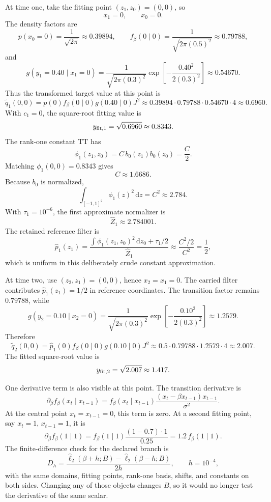 \documentclass[11pt]{article}
\newcommand{\dd}{\,\mathrm d}
\begin{document}
At time one, take the fitting point \((z_1,z_0)=(0,0)\), so
\[
    x_1=0,\qquad x_0=0.
    \label{eq:p24-trace-point1}
\]
The density factors are
\[
    p(x_0=0)=\frac{1}{\sqrt{2\pi}}\approx0.39894,
    \qquad
    f_\beta(0\mid0)=\frac{1}{\sqrt{2\pi(0.5)^2}}\approx0.79788,
    \label{eq:p24-trace-density1}
\]
and
\[
    g(y_1=0.40\mid x_1=0)
    =
    \frac{1}{\sqrt{2\pi(0.3)^2}}
    \exp\!\left[-\frac{0.40^2}{2(0.3)^2}\right]
    \approx0.54670.
    \label{eq:p24-trace-density2}
\]
Thus the transformed target value at this point is
\[
    \widetilde q_1(0,0)
    =
    p(0)f_\beta(0\mid0)g(0.40\mid0)J^2
    \approx
    0.39894\cdot0.79788\cdot0.54670\cdot4
    \approx0.6960.
    \label{eq:p24-trace-q1}
\]
With \(c_1=0\), the square-root fitting value is
\[
    y_{\rm fit,1}=\sqrt{0.6960}\approx0.8343.
    \label{eq:p24-trace-root1}
\]
The rank-one constant TT has
\[
    \phi_1(z_1,z_0)=C\,b_0(z_1)b_0(z_0)=\frac{C}{2}.
    \label{eq:p24-trace-phi1}
\]
Matching \(\phi_1(0,0)=0.8343\) gives
\[
    C\approx1.6686.
    \label{eq:p24-trace-c1}
\]
Because \(b_0\) is normalized,
\[
    \int_{[-1,1]^2}\phi_1(z)^2\dd z=C^2\approx2.784.
    \label{eq:p24-trace-mass1}
\]
With \(\tau_1=10^{-6}\), the first approximate normalizer is
\[
    \widehat Z_1\approx2.784001.
    \label{eq:p24-trace-z1}
\]
The retained reference filter is
\[
    \widehat p_1(z_1)
    =
    \frac{\int\phi_1(z_1,z_0)^2\dd z_0+\tau_1/2}
         {\widehat Z_1}
    \approx
    \frac{C^2/2}{C^2}
    =
    \frac12,
    \label{eq:p24-trace-p1}
\]
which is uniform in this deliberately crude constant approximation.

At time two, use \((z_2,z_1)=(0,0)\), hence \(x_2=x_1=0\).  The carried
filter contributes \(\widehat p_1(z_1)=1/2\) in reference coordinates.  The
transition factor remains \(0.79788\), while
\[
    g(y_2=0.10\mid x_2=0)
    =
    \frac{1}{\sqrt{2\pi(0.3)^2}}
    \exp\!\left[-\frac{0.10^2}{2(0.3)^2}\right]
    \approx1.2579.
    \label{eq:p24-trace-density3}
\]
Therefore
\[
    \widetilde q_2(0,0)
    =
    \widehat p_1(0)f_\beta(0\mid0)g(0.10\mid0)J^2
    \approx
    0.5\cdot0.79788\cdot1.2579\cdot4
    \approx2.007.
    \label{eq:p24-trace-q2}
\]
The fitted square-root value is
\[
    y_{\rm fit,2}=\sqrt{2.007}\approx1.417.
    \label{eq:p24-trace-root2}
\]

One derivative term is also visible at this point.  The transition derivative
is
\[
    \partial_\beta f_\beta(x_t\mid x_{t-1})
    =
    f_\beta(x_t\mid x_{t-1})
    \frac{(x_t-\beta x_{t-1})x_{t-1}}{\sigma^2}.
    \label{eq:p24-trace-df}
\]
At the central point \(x_t=x_{t-1}=0\), this term is zero.  At a second
fitting point, say \(x_t=1\), \(x_{t-1}=1\), it is
\[
    \partial_\beta f_\beta(1\mid1)
    =
    f_\beta(1\mid1)
    \frac{(1-0.7)\cdot1}{0.25}
    =
    1.2\,f_\beta(1\mid1).
    \label{eq:p24-trace-df2}
\]
The finite-difference check for the declared branch is
\[
    D_h
    =
    \frac{\widehat\ell_2(\beta+h;B)-\widehat\ell_2(\beta-h;B)}
         {2h},
    \qquad h=10^{-4},
    \label{eq:p24-trace-fd}
\]
with the same domains, fitting points, rank-one basis, shifts, and constants
on both sides.  Changing any of those objects changes \(B\), so it would no
longer test the derivative of the same scalar.
\end{document}
